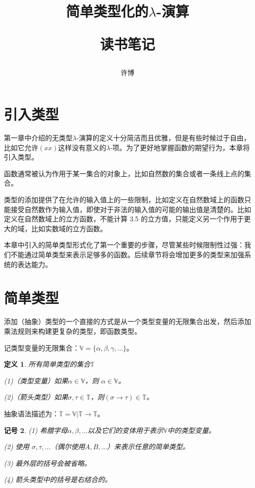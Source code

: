 \documentclass[UTF8]{article}
\title{简单类型化的$\lambda$-演算\\[2ex]\begin{large}读书笔记\end{large}}
\author{许博}
\date{}
\newtheorem{thm}{定义}[section]
\newtheorem{notation}[thm]{记号}
\begin{document}
\maketitle
	\section{引入类型}
		第一章中介绍的无类型$\lambda$-演算的定义十分简洁而且优雅，但是有些时候过于自由，比如它允许$(xx)$这样没有意义的$\lambda$-项。为了更好地掌握函数的期望行为，本章将引入类型。
		
		函数通常被认为作用于某一集合的对象上，比如自然数的集合或者一条线上点的集合。
		
		类型的添加提供了在允许的输入值上的一些限制，比如定义在自然数域上的函数只能接受自然数作为输入值，即使对于非法的输入值的可能的输出值是清楚的。比如定义在自然数域上的立方函数，不能计算 3.5 的立方值，只能定义另一个作用于更大的域，比如实数域的立方函数。
		
		本章中引入的简单类型形式化了第一个重要的步骤，尽管某些时候限制性过强：我们不能通过简单类型来表示足够多的函数。后续章节将会增加更多的类型来加强系统的表达能力。
		
	\section{简单类型}
		添加（抽象）类型的一个直接的方式是从一个类型变量的无限集合出发，然后添加乘法规则来构建更复杂的类型，即函数类型。
		
		记类型变量的无限集合：$\mathbb{V} = \{\alpha, \beta, \gamma, ...\}$。
		
		\begin{thm} 所有简单类型的集合$\mathbb{T}$
			
			(1)（类型变量）如果$\alpha \in \mathbb{V}$，则 $\alpha \in \mathbb{V}$。
			
			(2)（箭头类型）如果$\sigma,\tau\in\mathbb{T}$，则$(\sigma\rightarrow\tau)\in\mathbb{T}$。
			
		\end{thm}
	
		抽象语法描述为：$\mathbb{T}=\mathbb{V}|\mathbb{T}\rightarrow\mathbb{T}$。
		
		\begin{notation} 
			(1) 希腊字母$\alpha,\beta,...$以及它们的变体用于表示$\mathbb{V}$中的类型变量。
			
			(2) 使用 $\sigma,\tau,...$（偶尔使用$A,B,...$）来表示任意的简单类型。
			
			(3) 最外层的括号会被省略。
			
			(4) 箭头类型中的括号是右结合的。
		\end{notation}
	
\end{document}
